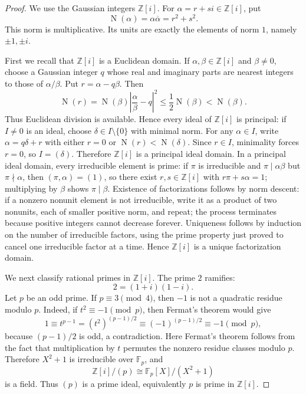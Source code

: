 \documentclass[11pt]{article}
\theoremstyle{remark}
\newcommand{\Norm}{\operatorname{N}}
\begin{document}
\begin{proof}
We use the Gaussian integers \(\mathbb Z[i]\).  For
\(\alpha=r+si\in\mathbb Z[i]\), put
\[
        \Norm(\alpha)=\alpha\overline{\alpha}=r^2+s^2.
\]
This norm is multiplicative.  Its units are exactly the elements of norm \(1\), namely \(\pm1,\pm i\).

First we recall that \(\mathbb Z[i]\) is a Euclidean domain.  If
\(\alpha,\beta\in\mathbb Z[i]\) and \(\beta\neq0\), choose a Gaussian integer
\(q\) whose real and imaginary parts are nearest integers to those of
\(\alpha/\beta\).  Put \(r=\alpha-q\beta\).  Then
\[
        \Norm(r)=\Norm(\beta)\left|\frac{\alpha}{\beta}-q\right|^2
        \leq \frac12\Norm(\beta)<\Norm(\beta).
\]
Thus Euclidean division is available.  Hence every ideal of \(\mathbb Z[i]\) is
principal: if \(I\neq0\) is an ideal, choose \(\delta\in I\setminus\{0\}\) with
minimal norm.  For any \(\alpha\in I\), write
\(\alpha=q\delta+r\) with either \(r=0\) or \(\Norm(r)<\Norm(\delta)\).  Since
\(r\in I\), minimality forces \(r=0\), so \(I=(\delta)\).  Therefore
\(\mathbb Z[i]\) is a principal ideal domain.  In a principal ideal domain,
every irreducible element is prime: if \(\pi\) is irreducible and
\(\pi\mid \alpha\beta\) but \(\pi\nmid\alpha\), then
\((\pi,\alpha)=(1)\), so there exist \(r,s\in\mathbb Z[i]\) with
\(r\pi+s\alpha=1\); multiplying by \(\beta\) shows \(\pi\mid\beta\).  Existence of factorizations follows by norm descent: if a nonzero nonunit element is not irreducible, write it as a product of two nonunits, each of smaller positive norm, and repeat; the process terminates because positive integers cannot decrease forever.  Uniqueness follows by induction on the number of irreducible factors, using the prime property just proved to cancel one irreducible factor at a time.  Hence \(\mathbb Z[i]\) is a unique factorization domain.

We next classify rational primes in \(\mathbb Z[i]\).  The prime \(2\) ramifies:
\[
        2=(1+i)(1-i).
\]
Let \(p\) be an odd prime.  If \(p\equiv3\pmod4\), then \(-1\) is not a quadratic
residue modulo \(p\).  Indeed, if \(t^2\equiv-1\pmod p\), then Fermat's theorem would give
\[
        1\equiv t^{p-1}=(t^2)^{(p-1)/2}\equiv (-1)^{(p-1)/2}\equiv -1\pmod p,
\]
because \((p-1)/2\) is odd, a contradiction.  Here Fermat's theorem follows from the fact that multiplication by \(t\) permutes the nonzero residue classes modulo \(p\).  Therefore
\(X^2+1\) is irreducible over \(\mathbb F_p\), and
\[
        \mathbb Z[i]/(p)\cong \mathbb F_p[X]/(X^2+1)
\]
is a field.  Thus \((p)\) is a prime ideal, equivalently \(p\) is prime in
\(\mathbb Z[i]\).


\end{proof}
\end{document}

